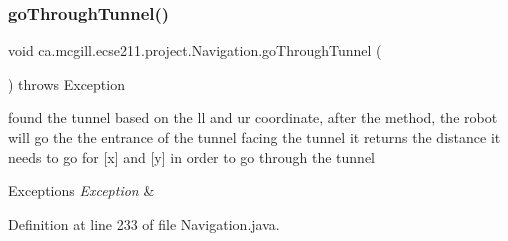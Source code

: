 \subsubsection{\texorpdfstring{go\+Through\+Tunnel()}{goThroughTunnel()}}
{\footnotesize\ttfamily void ca.\+mcgill.\+ecse211.\+project.\+Navigation.\+go\+Through\+Tunnel (\begin{DoxyParamCaption}{ }\end{DoxyParamCaption}) throws Exception}

found the tunnel based on the ll and ur coordinate, after the method, the robot will go the the entrance of the tunnel facing the tunnel it returns the distance it needs to go for \mbox{[}x\mbox{]} and \mbox{[}y\mbox{]} in order to go through the tunnel


\begin{DoxyExceptions}{Exceptions}
{\em Exception} & \\
\hline
\end{DoxyExceptions}


Definition at line 233 of file Navigation.\+java.


